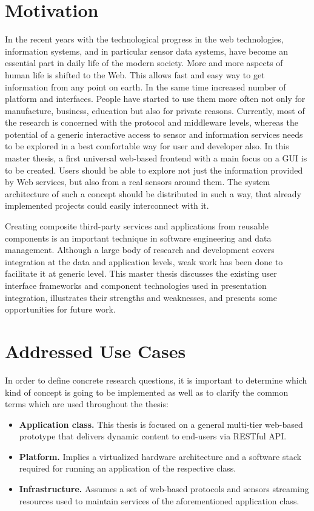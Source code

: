 \section{Motivation}
     In the recent years with the technological progress in the web technologies, information systems, and in particular sensor data systems, have become an essential part in daily life of the modern society. More and more aspects of human life is shifted to the Web. This allows fast and easy way to get information from any point on earth. In the same time increased number of platform and interfaces. People have started to use them more often not only for manufacture, business, education but also for private reasons. Currently, most of the research is concerned with the protocol and middleware levels, whereas the potential of a generic interactive access to sensor and information services needs to be explored in a best comfortable way for user and developer also. In this master thesis, a first universal web-based frontend with a main focus on a GUI is to be created. Users should be able to explore not just the information provided by Web services, but also from a real sensors around them. The system architecture of such a concept should be distributed in such a way, that already implemented projects could easily interconnect with it.

     Creating composite third-party services and applications from reusable components is an important technique in software engineering and data management. Although a large body of research and development covers integration at the data and application levels, weak work has been done to facilitate it at generic level. This master thesis discusses the existing user interface frameworks and component technologies used in presentation integration, illustrates their strengths and weaknesses, and presents some opportunities for future work.

\section{Addressed Use Cases}
     In order to define concrete research questions, it is important to determine which kind of concept is going to be implemented as well as to clarify the common terms which are used throughout the thesis:
     \begin{itemize}
          \item \textbf{Application class.} This thesis is focused on a general multi-tier web-based prototype that delivers dynamic content to end-users via RESTful API.

          \item \textbf{Platform.} Implies a virtualized hardware architecture and a software stack required for running an application of the respective class.

          \item \textbf{Infrastructure.} Assumes a set of web-based protocols and sensors streaming resources used to maintain services of the aforementioned application class.
     \end{itemize}


